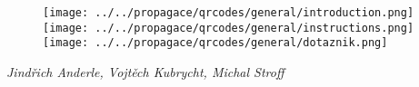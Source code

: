 \documentclass{../../style/mkimain}
\begin{document}
\noindent\begin{minipage}{\linewidth}
  \vspace{1cm}
  \begin{figure}[H]
        \texttt{[image: ../../propagace/qrcodes/general/introduction.png]}
      \endminipage\hfill
        \texttt{[image: ../../propagace/qrcodes/general/instructions.png]}
      \endminipage\hfill
        \texttt{[image: ../../propagace/qrcodes/general/dotaznik.png]}
      \endminipage
  \end{figure}
  \vspace{1,5cm}
  \begin{center}
    \textit{Jindřich Anderle, Vojtěch Kubrycht, Michal Stroff\\}
    \vspace{0.5cm}
    \color{blue}{kvantuminformaci@gmail.com}
  \end{center}
  \vspace*{\fill}
\end{minipage}
\end{document}
